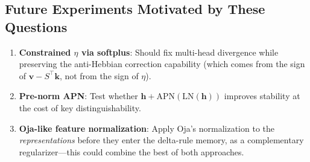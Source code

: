 \documentclass[11pt,a4paper]{article}
\begin{document}
\subsection{Future Experiments Motivated by These Questions}

\begin{enumerate}
\item \textbf{Constrained $\eta$ via softplus}: Should fix multi-head divergence while preserving the anti-Hebbian correction capability (which comes from the sign of $\mathbf{v} - S^\top\mathbf{k}$, not from the sign of $\eta$).
\item \textbf{Pre-norm APN}: Test whether $\mathbf{h} + \text{APN}(\text{LN}(\mathbf{h}))$ improves stability at the cost of key distinguishability.
\item \textbf{Oja-like feature normalization}: Apply Oja's normalization to the \emph{representations} before they enter the delta-rule memory, as a complementary regularizer---this could combine the best of both approaches.
\end{enumerate}
\end{document}
